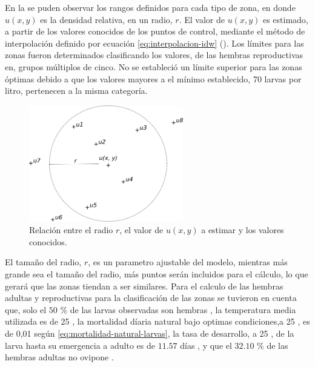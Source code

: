 En la  se puden observar los rangos definidos para cada tipo de
zona, en donde $u(x,y)$ es la densidad relativa, en un radio, $r$. El valor de $u(x,y)$ es
estimado, a partir de los valores conocidos de los puntos de control, mediante el método de
interpolación definido por ecuación \eqref{eq:interpolacion-idw} ().
Los límites para las zonas fueron determinados clasificando los valores, de las hembras
reproductivas en, grupos múltiplos de cinco. No se estableció un límite superior para las zonas
óptimas debido a que los valores mayores a el mínimo establecido, 70 larvas por litro, pertenecen
a la misma categoría.

\begin{figure}
\centering
\includegraphics[width=0.6\textwidth]{capitulo-4/graphics/zonificacion.png}
\caption{\label{fig:cap4-zonficiacion} Relación entre el radio $r$, el valor de $u(x,y)$ a estimar y los valores conocidos.}
\end{figure}

El tamaño del radio, $r$, es un parametro ajustable del modelo, mientras más grande sea el tamaño
del radio, más puntos serán incluidos para el cálculo, lo que gerará que las zonas tiendan a ser
similares. Para el calculo de las hembras adultas y reproductivas para la clasificación de las
zonas se tuvieron en cuenta que, solo el $50$ \% de las larvas observadas son hembras
\cite{otero2006stochastic, manrique1998desarrollo}, la temperatura media utilizada es de 25
\textcelsius \cite{website:mspbsHistoria2014}, la mortalidad díaria natural bajo optimas
condiciones,a 25 \textcelsius, es de 0,01 según \eqref{eq:mortalidad-natural-larvas}, la tasa de
desarrollo, a 25 \textcelsius, de la larva hasta su emergencia a adulto es de $11.57$ días
\cite{rueda1990temperature}, y que el $32.10$ \% de las hembras adultas no ovipone
\citep{osoriopontificia}.
